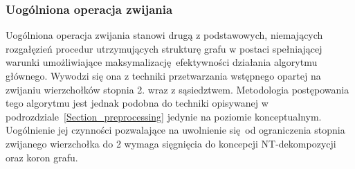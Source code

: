\subsubsection{\textbf{Uogólniona operacja zwijania}}\label{sss_ckx_general_fold}
\par{
  Uogólniona operacja zwijania stanowi drugą z podstawowych, niemających rozgałęzień procedur utrzymujących strukturę grafu w postaci spełniającej warunki umożliwiające maksymalizację efektywności działania algorytmu głównego.
  Wywodzi się ona z techniki przetwarzania wstępnego opartej na zwijaniu wierzchołków stopnia 2. wraz z sąsiedztwem.
  Metodologia postępowania tego algorytmu jest jednak podobna do techniki opisywanej w podrozdziale~\ref{Section_preprocessing} jedynie na poziomie konceptualnym.
  Uogólnienie jej czynności pozwalające na uwolnienie się od ograniczenia stopnia zwijanego wierzchołka do 2 wymaga sięgnięcia do koncepcji NT-dekompozycji oraz koron grafu.
}
